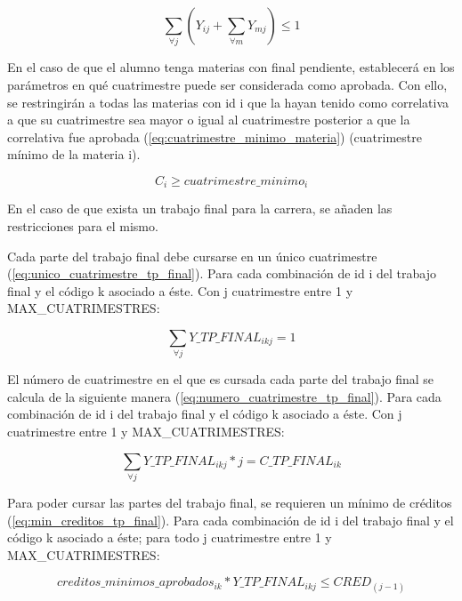 \documentclass[a4paper]{article}
\begin{document}
\begin{equation}\label{eq:materias_incompatibles}
\sum_{\forall j} (Y_{ij} + \sum_{\forall m} Y_{mj}) \leq 1
\end{equation}

En el caso de que el alumno tenga materias con final pendiente, establecerá en los parámetros en qué cuatrimestre puede ser considerada como aprobada. Con ello, se restringirán a todas las materias con id i que la hayan tenido como correlativa a que su cuatrimestre sea mayor o igual al cuatrimestre posterior a que la correlativa fue aprobada (\ref{eq:cuatrimestre_minimo_materia}) (cuatrimestre mínimo de la materia i).

\begin{equation}\label{eq:cuatrimestre_minimo_materia}
C_i \geq cuatrimestre\_minimo_i
\end{equation}

En el caso de que exista un trabajo final para la carrera, se añaden las restricciones para el mismo.

Cada parte del trabajo final debe cursarse en un único cuatrimestre (\ref{eq:unico_cuatrimestre_tp_final}). Para cada combinación de id i del trabajo final y el código k asociado a éste. Con j cuatrimestre entre 1 y MAX\_CUATRIMESTRES:

\begin{equation}\label{eq:unico_cuatrimestre_tp_final}
\sum_{\forall j} Y\_TP\_FINAL_{ikj} = 1
\end{equation}

El número de cuatrimestre en el que es cursada cada parte del trabajo final se calcula de la siguiente manera (\ref{eq:numero_cuatrimestre_tp_final}). Para cada combinación de id i del trabajo final y el código k asociado a éste. Con j cuatrimestre entre 1 y MAX\_CUATRIMESTRES:

\begin{equation}\label{eq:numero_cuatrimestre_tp_final}
\sum_{\forall j} Y\_TP\_FINAL_{ikj} * j = C\_TP\_FINAL_{ik}
\end{equation}

Para poder cursar las partes del trabajo final, se requieren un mínimo de créditos (\ref{eq:min_creditos_tp_final}). Para cada combinación de id i del trabajo final y el código k asociado a éste; para todo j cuatrimestre entre 1 y MAX\_CUATRIMESTRES:

\begin{equation}\label{eq:min_creditos_tp_final}
creditos\_minimos\_aprobados_{ik} * Y\_TP\_FINAL_{ikj} \leq CRED_{(j-1)}
\end{equation}
\end{document}
